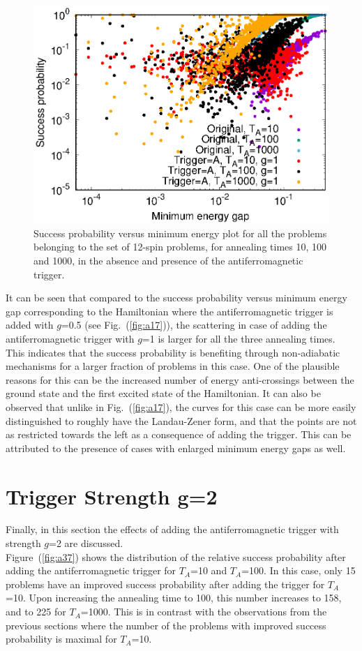 \documentclass[../main.tex]{subfiles}
\begin{document}
\begin{figure}[H]
\centering 
\includegraphics[scale=0.8 ]{SuccVsGap_OA_g1.eps}
\caption{Success probability versus minimum energy plot for all the problems belonging to the set of 12-spin problems, for annealing times 10, 100 and 1000, in the absence and presence of the antiferromagnetic trigger.}
\label{fig:a36}
\end{figure}

It can be seen that compared to the success probability versus minimum energy gap corresponding to the Hamiltonian where the antiferromagnetic trigger is added with $g$=0.5 (see Fig.~(\ref{fig:a17})), the scattering in case of adding the antiferromagnetic trigger with $g$=1 is larger for all the three annealing times. This indicates that the success probability is benefiting through non-adiabatic mechanisms for a larger fraction of problems in this case. One of the plausible reasons for this can be the increased number of energy anti-crossings between the ground state and the first excited state of the Hamiltonian. It can also be observed that unlike in Fig.~(\ref{fig:a17}), the curves for this case can be more easily distinguished to roughly have the Landau-Zener form, and that the points are not as restricted towards the left as a consequence of adding the trigger. This can be attributed to the presence of cases with enlarged minimum energy gaps as well.


\section{Trigger Strength g=2}
Finally, in this section the effects of adding the antiferromagnetic trigger with strength $g$=2 are discussed.\\
Figure~(\ref{fig:a37}) shows the distribution of the relative success probability after adding the antiferromagnetic trigger for $T_A$=10 and $T_A$=100. In this case, only 15 problems have an improved success probability after adding the trigger for $T_A$=10. Upon increasing the annealing time to 100, this number increases to 158, and to 225 for $T_A$=1000. This is in contrast with the observations from the previous sections where the number of the problems with improved success probability is maximal for $T_A$=10. 
\end{document}
